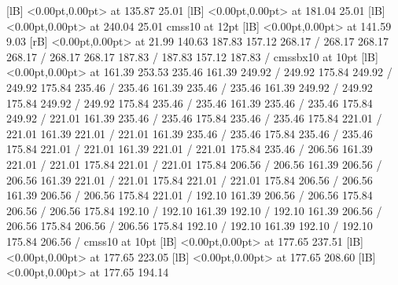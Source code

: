 {  [lB] <0.00pt,0.00pt> at 135.87 25.01
  [lB] <0.00pt,0.00pt> at 181.04 25.01
  [lB] <0.00pt,0.00pt> at 240.04 25.01
\font\picfont cmss10 at 12pt\picfont
{}  [lB] <0.00pt,0.00pt> at 141.59 9.03
 [rB] <0.00pt,0.00pt> at 21.99 140.63
\setsolid
{} 187.83 157.12 268.17 /
 268.17 268.17 268.17 /
 268.17 268.17 187.83 /
 187.83 157.12 187.83 /
\font\picfont cmssbx10 at 10pt\picfont
{}  [lB] <0.00pt,0.00pt> at 161.39 253.53
\setsolid
{} 235.46 161.39 249.92 /
 249.92 175.84 249.92 /
 249.92 175.84 235.46 /
 235.46 161.39 235.46 /
\setsolid
{} 235.46 161.39 249.92 /
 249.92 175.84 249.92 /
 249.92 175.84 235.46 /
 235.46 161.39 235.46 /
\setsolid
{} 235.46 175.84 249.92 /
\setsolid
{} 221.01 161.39 235.46 /
 235.46 175.84 235.46 /
 235.46 175.84 221.01 /
 221.01 161.39 221.01 /
\setsolid
{} 221.01 161.39 235.46 /
 235.46 175.84 235.46 /
 235.46 175.84 221.01 /
 221.01 161.39 221.01 /
\setsolid
{} 221.01 175.84 235.46 /
\setsolid
{} 206.56 161.39 221.01 /
 221.01 175.84 221.01 /
 221.01 175.84 206.56 /
 206.56 161.39 206.56 /
\setsolid
{} 206.56 161.39 221.01 /
 221.01 175.84 221.01 /
 221.01 175.84 206.56 /
 206.56 161.39 206.56 /
\setsolid
{} 206.56 175.84 221.01 /
\setsolid
{} 192.10 161.39 206.56 /
 206.56 175.84 206.56 /
 206.56 175.84 192.10 /
 192.10 161.39 192.10 /
\setsolid
{} 192.10 161.39 206.56 /
 206.56 175.84 206.56 /
 206.56 175.84 192.10 /
 192.10 161.39 192.10 /
\setsolid
{} 192.10 175.84 206.56 /
\font\picfont cmss10 at 10pt\picfont
{}  [lB] <0.00pt,0.00pt> at 177.65 237.51
  [lB] <0.00pt,0.00pt> at 177.65 223.05
  [lB] <0.00pt,0.00pt> at 177.65 208.60
  [lB] <0.00pt,0.00pt> at 177.65 194.14
\endpicture
}
